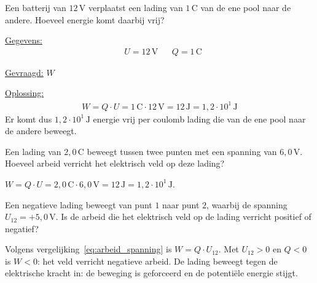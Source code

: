\documentclass{ximera}
\begin{document}
\begin{example}[foldable=true,title={Voorbeeld: energie geleverd door een batterij}]\nl
Een batterij van $12 \, \mathrm{V}$ verplaatst een lading van $1 \, \mathrm{C}$ van de ene pool naar de andere. Hoeveel energie komt daarbij vrij?

\begin{solution}\nl
\underline{Gegevens:}
\begin{align*}
    & U = 12 \, \mathrm{V} & & Q = 1 \, \mathrm{C}
\end{align*}

\underline{Gevraagd:} $W$

\underline{Oplossing:}
\begin{align*}
    W = Q \cdot U = 1 \, \mathrm{C} \cdot 12 \, \mathrm{V} = 12 \, \mathrm{J} = \boxed{1{,}2 \cdot 10^{1} \, \mathrm{J}}
\end{align*}
Er komt dus $1{,}2 \cdot 10^{1} \, \mathrm{J}$ energie vrij per coulomb lading die van de ene pool naar de andere beweegt.
\end{solution}
\end{example}

\begin{question}
    Een lading van $2{,}0 \, \mathrm{C}$ beweegt tussen twee punten met een spanning van $6{,}0 \, \mathrm{V}$. Hoeveel arbeid verricht het elektrisch veld op deze lading?

    \begin{multipleChoice}
    \end{multipleChoice}

    \begin{solution}\nl
        $W = Q \cdot U = 2{,}0 \, \mathrm{C} \cdot 6{,}0 \, \mathrm{V} = 12 \, \mathrm{J} = 1{,}2 \cdot 10^{1} \, \mathrm{J}$.
    \end{solution}
\end{question}

\begin{question}
    Een negatieve lading beweegt van punt $1$ naar punt $2$, waarbij de spanning $U_{12} = +5{,}0 \, \mathrm{V}$. Is de arbeid die het elektrisch veld op de lading verricht positief of negatief?

    \begin{multipleChoice}
    \end{multipleChoice}

    \begin{solution}\nl
        Volgens vergelijking~\ref{eq:arbeid_spanning} is $W = Q \cdot U_{12}$. Met $U_{12} > 0$ en $Q < 0$ is $W < 0$: het veld verricht negatieve arbeid. De lading beweegt tegen de elektrische kracht in: de beweging is geforceerd en de potentiële energie stijgt.
    \end{solution}
\end{question}
\end{document}

